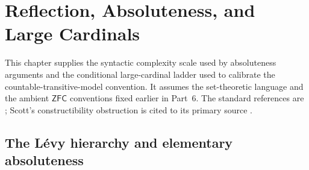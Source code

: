 
\chapter{Reflection, Absoluteness, and Large Cardinals}
\label{sec:p06-large-cardinals-absoluteness}

This chapter supplies the syntactic complexity scale used by absoluteness
arguments and the conditional large-cardinal ladder used to calibrate the
countable-transitive-model convention.  It assumes the set-theoretic language
and the ambient \(\mathsf{ZFC}\) conventions fixed earlier in Part~6.  The
standard references are \cite{Jech2003,Kanamori2003,Moschovakis2009}; Scott's
constructibility obstruction is cited to its primary source
\cite{Scott1961}.

\section{The L\'evy hierarchy and elementary absoluteness}
\label{sec:p06-levy-hierarchy}

